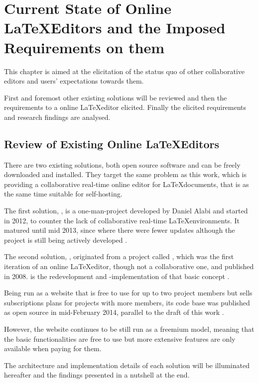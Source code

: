 \chapter{Current State of Online \LaTeX Editors and the Imposed Requirements on them}
This chapter is aimed at the elicitation of the status quo of other collaborative editors and users' expectations towards them.

First and foremost other existing solutions will be reviewed and then the requirements to a online \LaTeX editor elicited. Finally the elicited requirements and research findings are analysed.

\section{Review of Existing Online \LaTeX Editors}
\label{sec:existing-solutions}
There are two existing solutions, both open source software and can be freely downloaded and installed. They target the same problem as this work, which is providing a collaborative real-time online editor for \LaTeX documents, that is as the same time suitable for self-hosting. 

The first solution, , is a one-man-project developed by Daniel Alabi and started in 2012, to counter the lack of collaborative real-time \LaTeX environments. It matured until mid 2013, since where there were fewer updates although the project is still being actively developed \cite{website:flylatex-commits}. 

The second solution, , originated from a project called , which was the first iteration of an online \LaTeX editor, though not a collaborative one, and published in 2008.  is the redevelopment and -implementation of that basic concept \cite{website:scribtex} \cite{website:sharelatex}. 

Being run as a website that is free to use for up to two project members but sells subscriptions plans for projects with more members, its code base was published as open source in mid-February 2014, parallel to the draft of this work \cite{website:sharelatex-oss}. 

However, the website continues to be still run as a freemium model, meaning that the basic functionalities are free to use but more extensive features are only available when paying for them.

The architecture and implementation details of each solution will be illuminated hereafter and the findings presented in a nutshell at the end.

